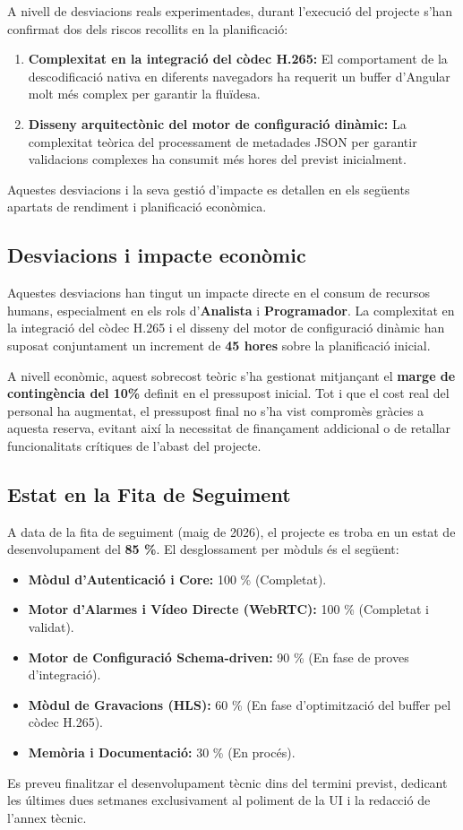 A nivell de desviacions reals experimentades, durant l'execució del projecte s'han confirmat dos dels riscos recollits en la planificació:
\begin{enumerate}
  \item \textbf{Complexitat en la integració del còdec H.265:} El comportament de la descodificació nativa en diferents navegadors ha requerit un buffer d'Angular molt més complex per garantir la fluïdesa.
  \item \textbf{Disseny arquitectònic del motor de configuració dinàmic:} La complexitat teòrica del processament de metadades JSON per garantir validacions complexes ha consumit més hores del previst inicialment.
\end{enumerate}
Aquestes desviacions i la seva gestió d'impacte es detallen en els següents apartats de rendiment i planificació econòmica.

\subsection{Desviacions i impacte econòmic}
Aquestes desviacions han tingut un impacte directe en el consum de recursos humans, especialment en els rols d'\textbf{Analista} i \textbf{Programador}. La complexitat en la integració del còdec H.265 i el disseny del motor de configuració dinàmic han suposat conjuntament un increment de \textbf{45 hores} sobre la planificació inicial.

A nivell econòmic, aquest sobrecost teòric s'ha gestionat mitjançant el \textbf{marge de contingència del 10\%} definit en el pressupost inicial. Tot i que el cost real del personal ha augmentat, el pressupost final no s'ha vist compromès gràcies a aquesta reserva, evitant així la necessitat de finançament addicional o de retallar funcionalitats crítiques de l'abast del projecte.

\subsection{Estat en la Fita de Seguiment}
A data de la fita de seguiment (maig de 2026), el projecte es troba en un estat de desenvolupament del \textbf{85 \%}. El desglossament per mòduls és el següent:
\begin{itemize}
  \item \textbf{Mòdul d'Autenticació i Core:} 100 \% (Completat).
  \item \textbf{Motor d'Alarmes i Vídeo Directe (WebRTC):} 100 \% (Completat i validat).
  \item \textbf{Motor de Configuració Schema-driven:} 90 \% (En fase de proves d'integració).
  \item \textbf{Mòdul de Gravacions (HLS):} 60 \% (En fase d'optimització del buffer pel còdec H.265).
  \item \textbf{Memòria i Documentació:} 30 \% (En procés).
\end{itemize}
Es preveu finalitzar el desenvolupament tècnic dins del termini previst, dedicant les últimes dues setmanes exclusivament al poliment de la UI i la redacció de l'annex tècnic.

